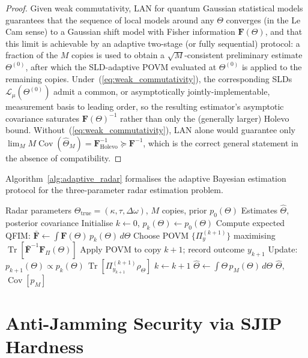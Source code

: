 \documentclass[journal]{IEEEtran}
\DeclareMathOperator{\Tr}{Tr}
\DeclareMathOperator{\Cov}{Cov}
\begin{document}
\begin{proof}
Given weak commutativity, LAN for quantum Gaussian statistical models~\cite{gill2013asymptotic,guta2006local} guarantees that the sequence of local models around any $\Theta$ converges (in the Le Cam sense) to a Gaussian shift model with Fisher information $\mathbf F(\Theta)$, and that this limit is achievable by an adaptive two-stage (or fully sequential) protocol: a fraction of the $M$ copies is used to obtain a $\sqrt M$-consistent preliminary estimate $\Theta^{(0)}$, after which the SLD-adaptive POVM evaluated at $\Theta^{(0)}$ is applied to the remaining copies. Under~(\ref{eq:weak_commutativity}), the corresponding SLDs $\mathcal L_\mu(\Theta^{(0)})$ admit a common, or asymptotically jointly-implementable, measurement basis to leading order, so the resulting estimator's asymptotic covariance saturates $\mathbf F(\Theta)^{-1}$ rather than only the (generally larger) Holevo bound. Without~(\ref{eq:weak_commutativity}), LAN alone would guarantee only $\lim_M M\Cov(\hat\Theta_M) = \mathbf F_{\text{Holevo}}^{-1} \succeq \mathbf F^{-1}$, which is the correct general statement in the absence of compatibility.
\end{proof}

Algorithm~\ref{alg:adaptive_radar} formalises the adaptive Bayesian estimation protocol for the three-parameter radar estimation problem.

\begin{algorithm}[htbp]
\caption{Adaptive Bayesian Radar Parameter Estimation}\label{alg:adaptive_radar}
\begin{algorithmic}[1]
\Require Radar parameters $\Theta_{\text{true}} = (\kappa, \tau, \Delta\omega)$, $M$ copies, prior $p_0(\Theta)$
\Ensure Estimates $\hat{\Theta}$, posterior covariance
\State Initialise $k \gets 0$, $p_k(\Theta) \gets p_0(\Theta)$
    \State Compute expected QFIM: $\bar{\mathbf{F}} \gets \int \mathbf{F}(\Theta)\, p_k(\Theta)\, d\Theta$
    \State Choose POVM $\{\Pi_{y}^{(k+1)}\}$ maximising $\Tr[\bar{\mathbf{F}}^{-1}\mathbf{F}_{\Pi}(\Theta)]$
    \State Apply POVM to copy $k+1$; record outcome $y_{k+1}$
    \State Update: $p_{k+1}(\Theta) \propto p_k(\Theta)\, \Tr[\Pi_{y_{k+1}}^{(k+1)}\rho_{\Theta}]$
    \State $k \gets k + 1$
\EndWhile
\State $\hat{\Theta} \gets \int \Theta\, p_M(\Theta)\, d\Theta$
\State \Return $\hat{\Theta}$, $\Cov[p_M]$
\end{algorithmic}
\end{algorithm}


\section{Anti-Jamming Security via SJIP Hardness}\label{sec:security}
\end{document}
